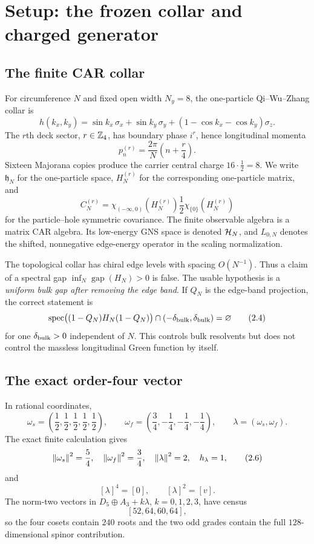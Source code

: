 \section{Setup: the frozen collar and charged generator}
\label{sec:setup}

\subsection{The finite CAR collar}

For circumference $N$ and fixed open width $N_y=8$, the one-particle
Qi--Wu--Zhang collar is
\[
 h(k_x,k_y)
 =\sin k_x\,\sigma_x+\sin k_y\,\sigma_y+
   (1-\cos k_x-\cos k_y)\sigma_z .
\tag{2.1}\label{eq:qwz}
\]
The $r$th deck sector, $r\in\mathbb Z_4$, has boundary phase $i^r$, hence
longitudinal momenta
\[
 p_n^{(r)}=\frac{2\pi}{N}\left(n+\frac r4\right).
\tag{2.2}\label{eq:momentum}
\]
Sixteen Majorana copies produce the carrier central charge
$16\cdot\frac12=8$.  We write $\mathfrak h_N$ for the one-particle space,
$H_N^{(r)}$ for the corresponding one-particle matrix, and
\[
 C_N^{(r)}
 =\chi_{(-\infty,0)}(H_N^{(r)})
  \frac12\chi_{\{0\}}(H_N^{(r)})
\tag{2.3}\label{eq:covariance}
\]
for the particle--hole symmetric covariance.  The finite observable
algebra is a matrix CAR algebra.  Its low-energy GNS space is denoted
$\mathcal H_N$, and $L_{0,N}$ denotes the shifted, nonnegative edge-energy
operator in the scaling normalization.

\begin{remark}
\label{rem:gapcorrection}
The topological collar has chiral edge levels with spacing $O(N^{-1})$.
Thus a claim of a spectral gap
$\inf_N\operatorname{gap}(H_N)>0$ is false.  The usable hypothesis is a
\emph{uniform bulk gap after removing the edge band}.  If $Q_N$ is the
edge-band projection, the correct statement is
\[
 \operatorname{spec}\bigl((1-Q_N)H_N(1-Q_N)\bigr)
 \cap(-\delta_{\rm bulk},\delta_{\rm bulk})=\varnothing
\tag{2.4}\label{eq:bulkgap}
\]
for one $\delta_{\rm bulk}>0$ independent of $N$.  This controls bulk
resolvents but does not control the massless longitudinal Green function
by itself.
\end{remark}

\subsection{The exact order-four vector}

In rational coordinates,
\[
 \omega_s=\left(\frac12,\frac12,\frac12,\frac12,\frac12\right),
 \qquad
 \omega_f=\left(\frac34,-\frac14,-\frac14,-\frac14\right),
 \qquad
 \lambda=(\omega_s,\omega_f).
\tag{2.5}\label{eq:lambda}
\]
The exact finite calculation gives
\[
 \left\lVert\omega_s\right\rVert^2=\frac54,\quad
 \left\lVert\omega_f\right\rVert^2=\frac34,\quad
 \left\lVert\lambda\right\rVert^2=2,\quad h_\lambda=1,
\tag{2.6}\label{eq:lambda-norm}
\]
and
\[
 [\lambda]^4=[0],\qquad [\lambda]^2=[v].
\tag{2.7}\label{eq:lambda-order}
\]
The norm-two vectors in
$D_5\oplus A_3+k\lambda$, $k=0,1,2,3$, have census
\[
 [52,64,60,64],
\tag{2.8}\label{eq:census}
\]
so the four cosets contain $240$ roots and the two odd grades contain the
full $128$-dimensional spinor contribution.

